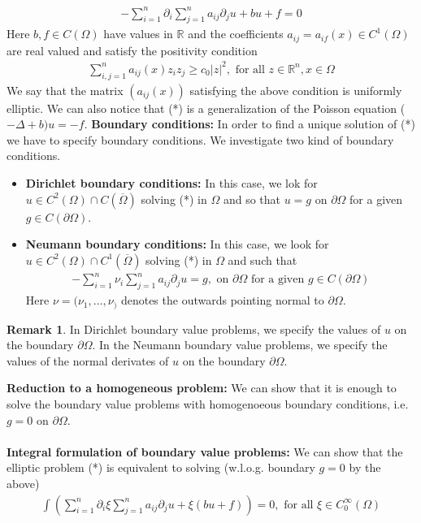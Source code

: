 \documentclass[11pt,a4paper]{article}
\theoremstyle{definition}
\newtheorem{rem}{Remark}[section]
\begin{document}
\begin{align*}
- \sum_{i=1}^n \partial_i \sum_{j=1}^n a_{ij} \partial_j u + bu + f =0 \tag{*}
\end{align*}
Here $b,f \in C( \Omega)$ have values in $\mathbb{R}$ and the coefficients $a_{ij} = a_{if}(x) \in C^1(\Omega)$ are real valued and satisfy the positivity condition 
\begin{align*}
\sum_{i,j=1}^n a_{ij}(x) z_i z_j \geq c_0 |z|^2, \text{ for all } z \in \mathbb{R}^n, x \in \Omega
\end{align*}
We say that the matrix $(a_{ij}(x))$ satisfying the above condition is uniformly elliptic. We can also notice that (*) is a generalization of the Poisson equation ($- \Delta + b)u = -f$. 
\newpage 
\textbf{Boundary conditions:} In order to find a unique solution of (*) we have to specify boundary conditions. We investigate two kind of boundary conditions. 
\begin{itemize}
\item \textbf{Dirichlet boundary conditions:} In this case, we lok for $u \in C^2( \Omega) \cap C( \overline{\Omega})$ solving (*) in $\Omega$ and so that $u = g$ on $\partial \Omega$ for a given $ g \in C( \partial \Omega)$.
\item \textbf{Neumann boundary conditions:} In this case, we look for $u \in C^2( \Omega) \cap C^1( \overline{\Omega})$ solving (*) in $\Omega$ and such that 
\begin{align*}
- \sum_{i=1}^n \nu_i \sum_{j=1}^n a_{ij} \partial_j u = g, \text{ on } \partial\Omega \text{ for a given } g \in C( \partial \Omega)
\end{align*}
Here $\nu = ( \nu_1, \dots , \nu_)$ denotes the outwards pointing normal to $\partial \Omega$. 
\end{itemize}
\begin{rem} In Dirichlet boundary value problems, we specify the values of $u$ on the boundary $\partial \Omega$. In the Neumann boundary value problems, we specify the values of the normal derivates of $u$ on the boundary $\partial \Omega$. 
\end{rem}
\textbf{Reduction to a homogeneous problem:} We can show that it is enough to solve the boundary value problems with homogenoeous boundary conditions, i.e. $g=0$ on $\partial \Omega$. 
\\\\
\textbf{Integral formulation of boundary value problems:} We can show that the elliptic problem (*) is equivalent to solving (w.l.o.g. boundary $g=0$ by the above) 
\begin{align*}
\int \left( \sum_{i=1}^n \partial_i \xi \sum_{j=1}^n a_{ij} \partial_j u + \xi (bu+f) \right)=0, \text{ for all } \xi \in C_0^\infty( \Omega)
\end{align*}
\end{document}
